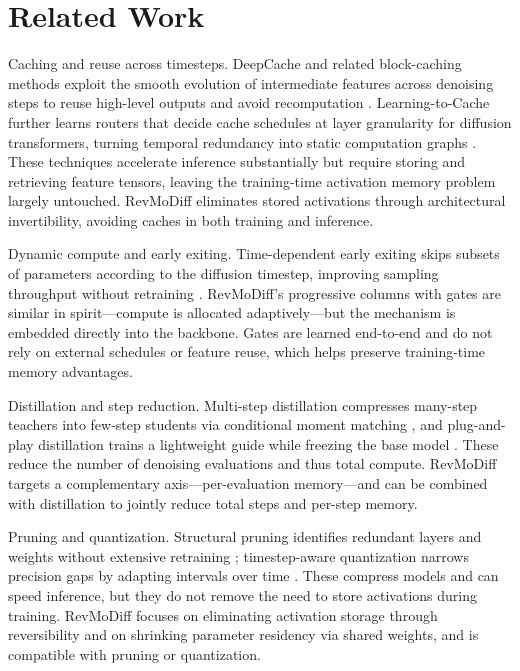 \documentclass{article}
\begin{document}
\section{Related Work}
Caching and reuse across timesteps. DeepCache and related block-caching methods exploit the smooth evolution of intermediate features across denoising steps to reuse high-level outputs and avoid recomputation \cite{ma-2023-deepcache,wimbauer-2023-cache}. Learning-to-Cache further learns routers that decide cache schedules at layer granularity for diffusion transformers, turning temporal redundancy into static computation graphs \cite{ma-2024-learning}. These techniques accelerate inference substantially but require storing and retrieving feature tensors, leaving the training-time activation memory problem largely untouched. RevMoDiff eliminates stored activations through architectural invertibility, avoiding caches in both training and inference.

Dynamic compute and early exiting. Time-dependent early exiting skips subsets of parameters according to the diffusion timestep, improving sampling throughput without retraining \cite{moon-2024-simple}. RevMoDiff’s progressive columns with gates are similar in spirit—compute is allocated adaptively—but the mechanism is embedded directly into the backbone. Gates are learned end-to-end and do not rely on external schedules or feature reuse, which helps preserve training-time memory advantages.

Distillation and step reduction. Multi-step distillation compresses many-step teachers into few-step students via conditional moment matching \cite{salimans-2024-multistep}, and plug-and-play distillation trains a lightweight guide while freezing the base model \cite{hsiao-2024-plug}. These reduce the number of denoising evaluations and thus total compute. RevMoDiff targets a complementary axis—per-evaluation memory—and can be combined with distillation to jointly reduce total steps and per-step memory.

Pruning and quantization. Structural pruning identifies redundant layers and weights without extensive retraining \cite{fang-2023-structural,zhu-2024-dip}; timestep-aware quantization narrows precision gaps by adapting intervals over time \cite{so-2023-temporal}. These compress models and can speed inference, but they do not remove the need to store activations during training. RevMoDiff focuses on eliminating activation storage through reversibility and on shrinking parameter residency via shared weights, and is compatible with pruning or quantization.
\end{document}
